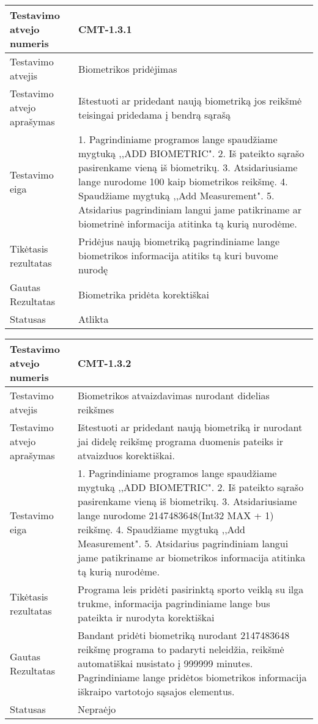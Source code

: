 \documentclass[oneside]{VUMIFPSkursinis}
\begin{document}
\begin{center}
    \begin{tabular}{ |p{5cm}|p{13cm}|}
    \hline
    	Testavimo atvejo numeris & CMT-1.3.1\\ \hline
    	Testavimo atvejis & Biometrikos pridėjimas \\ \hline
	Testavimo atvejo aprašymas & Ištestuoti ar pridedant naują biometriką jos reikšmė teisingai pridedama į bendrą sąrašą   \\ \hline
	Testavimo eiga &1. Pagrindiniame programos lange spaudžiame mygtuką ,,ADD BIOMETRIC". 
				2. Iš pateikto sąrašo pasirenkame vieną iš biometrikų. 
				3. Atsidariusiame lange nurodome 100 kaip biometrikos reikšmę.
				4. Spaudžiame mygtuką ,,Add Measurement".
				5. Atsidarius pagrindiniam langui jame patikriname ar biometrinė informacija atitinka tą kurią nurodėme.\\ \hline
	Tikėtasis rezultatas &  Pridėjus naują biometriką pagrindiniame lange biometrikos informacija atitiks tą kuri buvome nurodę\\ \hline
	Gautas Rezultatas & Biometrika pridėta korektiškai  \\ \hline
	Statusas &  Atlikta\\ \hline
    \hline
    \end{tabular}
\end{center}

\begin{center}
    \begin{tabular}{ |p{5cm}|p{13cm}|}
    \hline
    	Testavimo atvejo numeris & CMT-1.3.2  \\ \hline
    	Testavimo atvejis & Biometrikos atvaizdavimas nurodant didelias reikšmes  \\ \hline
	Testavimo atvejo aprašymas & Ištestuoti ar pridedant naują biometriką ir nurodant jai didelę reikšmę programa duomenis pateiks ir atvaizduos korektiškai.  \\ \hline
	Testavimo eiga & 1. Pagrindiniame programos lange spaudžiame mygtuką ,,ADD BIOMETRIC". 
				2. Iš pateikto sąrašo pasirenkame vieną iš biometrikų. 
				3. Atsidariusiame lange nurodome 2147483648(Int32 MAX + 1) reikšmę.
				4. Spaudžiame mygtuką ,,Add Measurement".
				5. Atsidarius pagrindiniam langui jame patikriname ar biometrikos informacija atitinka tą kurią nurodėme.\\ \hline
	Tikėtasis rezultatas & Programa leis pridėti pasirinktą sporto veiklą su ilga trukme, informacija pagrindiniame lange bus pateikta ir nurodyta korektiškai  \\ \hline
	Gautas Rezultatas & Bandant pridėti biometriką nurodant 2147483648 reikšmę programa to padaryti neleidžia, reikšmė automatiškai nusistato į 999999 minutes. Pagrindiniame lange pridėtos biometrikos informacija iškraipo vartotojo sąsajos elementus.  \\ \hline
	Statusas & Nepraėjo  \\ \hline
    \hline
    \end{tabular}
\end{center}
\end{document}
